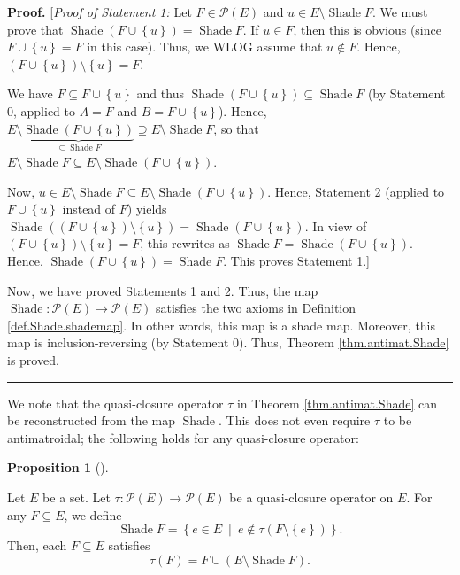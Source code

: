 \documentclass[numbers=enddot,12pt,final,onecolumn]{scrartcl}%
\theoremstyle{definition}
\newtheorem{prop}[theo]{Proposition}
\newenvironment{proposition}[1][]
{\begin{prop}[#1]\begin{leftbar}}
{\end{leftbar}\end{prop}}
\newenvironment{proof}[1][Proof]{\noindent\textbf{#1.} }{\ \rule{0.5em}{0.5em}}
\begin{document}
\begin{proof}
[\textit{Proof of Statement 1:} Let $F\in\mathcal{P}\left(  E\right)  $ and
$u\in E\setminus\operatorname*{Shade}F$. We must prove that
$\operatorname*{Shade}\left(  F\cup\left\{  u\right\}  \right)
=\operatorname*{Shade}F$. If $u\in F$, then this is obvious (since
$F\cup\left\{  u\right\}  =F$ in this case). Thus, we WLOG assume that
$u\notin F$. Hence, $\left(  F\cup\left\{  u\right\}  \right)  \setminus
\left\{  u\right\}  =F$.

We have $F\subseteq F\cup\left\{  u\right\}  $ and thus $\operatorname*{Shade}%
\left(  F\cup\left\{  u\right\}  \right)  \subseteq\operatorname*{Shade}F$ (by
Statement 0, applied to $A=F$ and $B=F\cup\left\{  u\right\}  $). Hence,
$E\setminus\underbrace{\operatorname*{Shade}\left(  F\cup\left\{  u\right\}
\right)  }_{\subseteq\operatorname*{Shade}F}\supseteq E\setminus
\operatorname*{Shade}F$, so that $E\setminus\operatorname*{Shade}F\subseteq
E\setminus\operatorname*{Shade}\left(  F\cup\left\{  u\right\}  \right)  $.

Now, $u\in E\setminus\operatorname*{Shade}F\subseteq E\setminus
\operatorname*{Shade}\left(  F\cup\left\{  u\right\}  \right)  $. Hence,
Statement 2 (applied to $F\cup\left\{  u\right\}  $ instead of $F$) yields
$\operatorname*{Shade}\left(  \left(  F\cup\left\{  u\right\}  \right)
\setminus\left\{  u\right\}  \right)  =\operatorname*{Shade}\left(
F\cup\left\{  u\right\}  \right)  $. In view of $\left(  F\cup\left\{
u\right\}  \right)  \setminus\left\{  u\right\}  =F$, this rewrites as
$\operatorname*{Shade}F=\operatorname*{Shade}\left(  F\cup\left\{  u\right\}
\right)  $. Hence, $\operatorname*{Shade}\left(  F\cup\left\{  u\right\}
\right)  =\operatorname*{Shade}F$. This proves Statement 1.]

Now, we have proved Statements 1 and 2. Thus, the map $\operatorname*{Shade}%
:\mathcal{P}\left(  E\right)  \rightarrow\mathcal{P}\left(  E\right)  $
satisfies the two axioms in Definition \ref{def.Shade.shademap}. In other
words, this map is a shade map. Moreover, this map is inclusion-reversing (by
Statement 0). Thus, Theorem \ref{thm.antimat.Shade} is proved.
\end{proof}

We note that the quasi-closure operator $\tau$ in Theorem
\ref{thm.antimat.Shade} can be reconstructed from the map
$\operatorname*{Shade}$. This does not even require $\tau$ to be
antimatroidal; the following holds for any quasi-closure operator:

\begin{proposition}
\label{prop.antimat.recover-tau}Let $E$ be a set. Let $\tau:\mathcal{P}\left(
E\right)  \rightarrow\mathcal{P}\left(  E\right)  $ be a quasi-closure
operator on $E$. For any $F\subseteq E$, we define%
\[
\operatorname*{Shade}F=\left\{  e\in E\ \mid\ e\notin\tau\left(
F\setminus\left\{  e\right\}  \right)  \right\}  .
\]
Then, each $F\subseteq E$ satisfies%
\begin{equation}
\tau\left(  F\right)  =F\cup\left(  E\setminus\operatorname*{Shade}F\right)  .
\label{eq.prop.antimat.recover-tau.tauF=}%
\end{equation}

\end{proposition}
\end{document}
